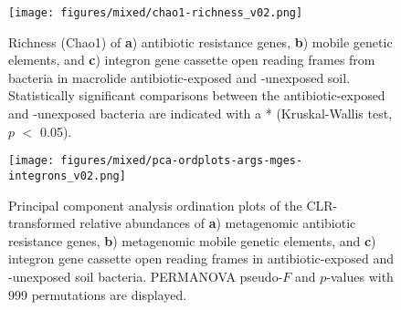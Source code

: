 \begin{figure}[htpb]
	\centering
		\texttt{[image: figures/mixed/chao1-richness\_v02.png]}
	\caption[Richness of antibiotic resistance genes, mobile genetic elements, and integron gene cassette open reading frames.]{
		Richness (Chao1) of \textbf{a}) antibiotic resistance genes, \textbf{b}) mobile genetic elements, and \textbf{c}) integron gene cassette open reading frames from bacteria in macrolide antibiotic-exposed and -unexposed soil. Statistically significant comparisons between the antibiotic-exposed and -unexposed bacteria are indicated with a * (Kruskal-Wallis test, $p$ $<$ 0.05).
	}
	\label{fig:chao1-richness}
\end{figure}

\begin{figure}[htpb]
	\centering
		\texttt{[image: figures/mixed/pca-ordplots-args-mges-integrons\_v02.png]}
	\caption[Principal component analysis ordination plots of metagenomic antibiotic resistance genes, metagenomic mobile genetic elements, and integron gene cassette open reading frames.]{
		Principal component analysis ordination plots of the CLR-transformed relative abundances of \textbf{a}) metagenomic antibiotic resistance genes, \textbf{b}) metagenomic mobile genetic elements, and \textbf{c}) integron gene cassette open reading frames in antibiotic-exposed and -unexposed soil bacteria.
		PERMANOVA pseudo-$F$ and $p$-values with 999 permutations are displayed.
	}
	\label{fig:pca-ordplots-args-mges-integrons}
\end{figure}

